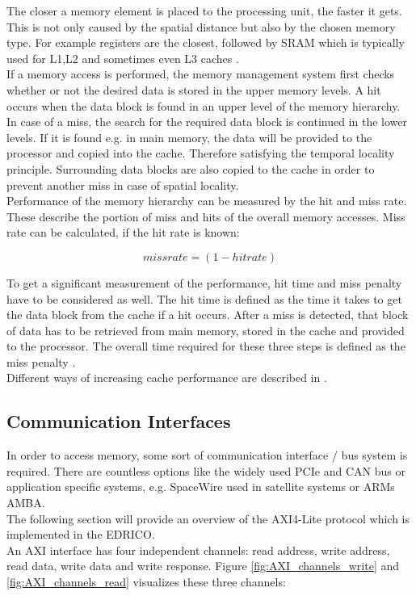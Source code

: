 The closer a memory element is placed to the processing unit, the faster it gets. This is not only caused by the spatial distance but also by the chosen memory type. For example registers are the closest, followed by SRAM which is typically used for L1,L2 and sometimes even L3 caches \cite{patterson:2017}.\\
If a memory access is performed, the memory management system first checks whether or not the desired data is stored in the upper memory levels. A hit occurs when the data block is found in an upper level of the memory hierarchy. In case of a miss, the search for the required data block is continued in the lower levels. If it is found e.g. in main memory, the data will be provided to the processor and copied into the cache. Therefore satisfying the temporal locality principle. Surrounding data blocks are also copied to the cache in order to prevent another miss in case of spatial locality.\\
Performance of the memory hierarchy can be measured by the hit and miss rate. These describe the portion of miss and hits of the overall memory accesses. Miss rate can be calculated, if the hit rate is known:

$$miss rate = (1 - hit rate)$$

To get a significant measurement of the performance, hit time and miss penalty have to be considered as well. The hit time is defined as the time it takes to get the data block from the cache if a hit occurs. After a miss is detected, that block of data has to be retrieved from main memory, stored in the cache and provided to the processor. The overall time required for these three steps is defined as the miss penalty \cite{patterson:2017}.\\
Different ways of increasing cache performance are described in \cite{patterson:2017}.\\


\subsection{Communication Interfaces}
\label{chapter:axiCommInterfaces}
In order to access memory, some sort of communication interface / bus system is required. There are countless options like the widely used \ac{PCIe} and \ac{CAN} bus or application specific systems, e.g. SpaceWire used in satellite systems or \acp{ARM} \ac{AMBA}.\\
The following section will provide an overview of the \ac{AXI4-Lite} protocol which is implemented in the \ac{EDRICO}.\\
An AXI interface has four independent channels: read address, write address, read data, write data and write response. Figure \ref{fig:AXI_channels_write} and \ref{fig:AXI_channels_read} visualizes these three channels:

